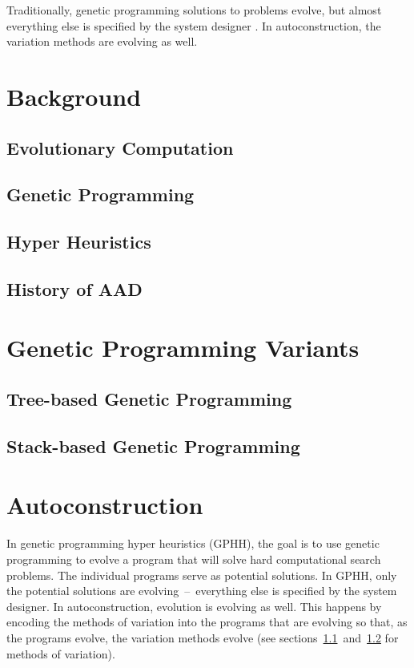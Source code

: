 \documentclass{sig-alternate}
\begin{document}
Traditionally, genetic programming solutions to problems evolve, but almost everything else is specified by the system designer \cite{spector:2016}. In autoconstruction, the variation methods are evolving as well.

\section{Background}
\label{sec:background}

\subsection{Evolutionary Computation}
\label{sec:evocomp}

\subsection{Genetic Programming}
\label{sec:GP}

\subsection{Hyper Heuristics}
\label{sec:HH}

\subsection{History of AAD}
\label{sec:history}

\section{Genetic Programming Variants}
\label{sec:gpvariants}

\subsection{Tree-based Genetic Programming}
\label{sec:tgp}

\subsection{Stack-based Genetic Programming}
\label{sec:sgp}

\section{Autoconstruction}
\label{sec:ac}
In genetic programming hyper heuristics (GPHH), the goal is to use genetic programming to evolve a program that will solve hard computational search problems. The individual programs serve as potential solutions. In GPHH, only the potential solutions are evolving~--~everything else is specified by the system designer.  In autoconstruction, evolution is evolving as well. This happens by encoding the methods of variation into the programs that are evolving so that, as the programs evolve, the variation methods evolve (see sections~\ref{sec:evocomp}~and~\ref{sec:GP} for methods of variation).
\end{document}
